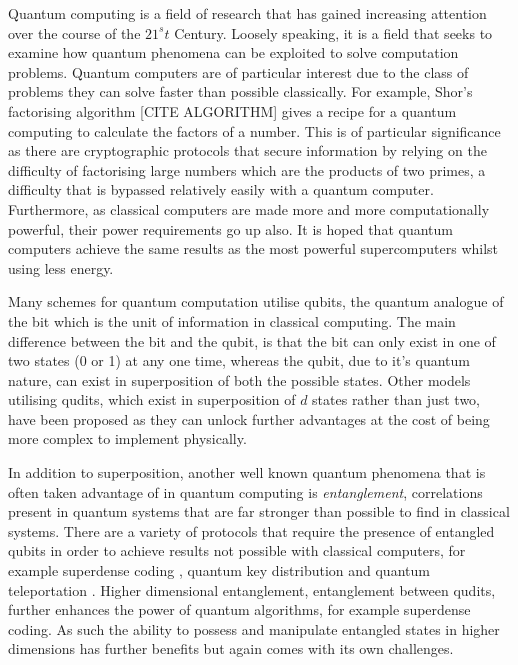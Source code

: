Quantum computing is a field of research that has gained increasing attention over the course of the $21^st$ Century.
Loosely speaking, it is a field that seeks to examine how quantum phenomena can be exploited to solve computation problems.
Quantum computers are of particular interest due to the class of problems they can solve faster than possible classically.
For example, Shor's factorising algorithm [CITE ALGORITHM] gives a recipe for a quantum computing to calculate the factors of a number.
This is of particular significance as there are cryptographic protocols that secure information by relying on the difficulty of factorising large numbers which are the products of two primes, a difficulty that is bypassed relatively easily with a quantum computer.
Furthermore, as classical computers are made more and more computationally powerful, their power requirements go up also.
It is hoped that quantum computers achieve the same results as the most powerful supercomputers whilst using less energy.

Many schemes for quantum computation utilise qubits, the quantum analogue of the bit which is the unit of information in classical computing.
The main difference between the bit and the qubit, is that the bit can only exist in one of two states (0 or 1) at any one time, whereas the qubit, due to it's quantum nature, can exist in superposition of both the possible states.
Other models utilising qudits, which exist in superposition of $d$ states rather than just two, have been proposed as they can unlock further advantages at the cost of being more complex to implement physically.

In addition to superposition, another well known quantum phenomena that is often taken advantage of in quantum computing is \emph{entanglement}, correlations present in quantum systems that are far stronger than possible to find in classical systems.
There are a variety of protocols that require the presence of entangled qubits in order to achieve results not possible with classical computers, for example superdense coding \cite{Superdense}, quantum key distribution \cite{qkd} and quantum teleportation \cite{qteleport}.
Higher dimensional entanglement, entanglement between qudits, further enhances the power of quantum algorithms, for example superdense coding.
As such the ability to possess and manipulate entangled states in higher dimensions has further benefits but again comes with its own challenges. 

